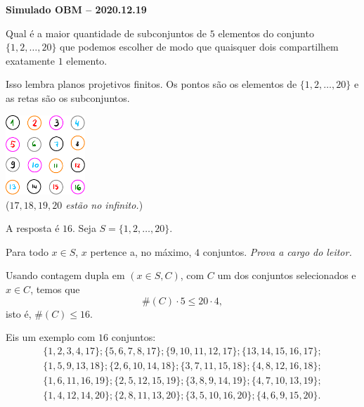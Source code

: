 \documentclass[10pt, a4paper]{article}
\begin{document}
\begin{center}
	\textbf{Simulado OBM -- 2020.12.19}\\
\end{center}

\begin{prob}
	Qual é a maior quantidade de subconjuntos de $5$ elementos do conjunto $\{1, 2, \dots, 20\}$ que podemos escolher de modo que quaisquer dois compartilhem exatamente $1$ elemento.
\end{prob}

\begin{sk}
	Isso lembra planos projetivos finitos. Os pontos são os elementos de $\{1, 2, \dots, 20\}$ e as retas são os subconjuntos.

	\begin{center}
		\includegraphics[height = 3cm]{fig_p1}\\
	(\emph{$17, 18, 19, 20$ estão no infinito.})
	\end{center}
\end{sk}

\begin{sol}
	A resposta é $16$. Seja $S = \{1, 2, \dots, 20\}$.

	Para todo $x \in S$, $x$ pertence a, no máximo, $4$ conjuntos. \emph{Prova a cargo do leitor.}

	Usando contagem dupla em $(x \in S, C)$, com $C$ um dos conjuntos selecionados e $x \in C$, temos que \[\#(C) \cdot 5 \le 20 \cdot 4,\]
	isto é, $\#(C) \le 16$.

	Eis um exemplo com $16$ conjuntos:
	\begin{gather*}
		\{	1,  2,  3,  4,  17 \};
	\{	5,  6,  7,  8,  17 \};
	\{	9,  10, 11, 12, 17 \};
	\{	13, 14, 15, 16, 17 \};\\
	\{	1,  5,  9,  13, 18 \};
	\{	2,  6,  10, 14, 18 \};
	\{	3,  7,  11, 15, 18 \};
	\{	4,  8,  12, 16, 18 \};\\
	\{	1,  6,  11, 16, 19 \};
	\{	2,  5,  12, 15, 19 \};
	\{	3,  8,  9,  14, 19 \};
	\{	4,  7,  10, 13, 19 \};\\
	\{	1,  4,  12, 14, 20 \};
	\{	2,  8,  11, 13, 20 \};
	\{	3,  5,  10, 16, 20 \};
	\{	4,  6,  9,  15, 20 \}.
	\end{gather*}
\end{sol}
\end{document}
